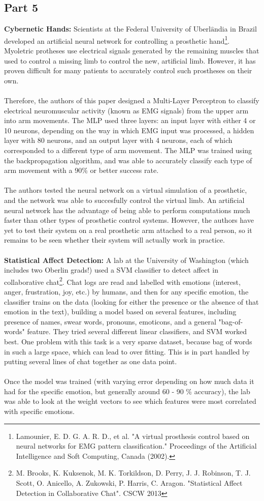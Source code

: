 \documentclass[11pt]{article}
\begin{document}
\subsection*{Part 5}

{\bf Cybernetic Hands:} Scientists at the Federal University of Uberl$\hat{\text{a}}$ndia in Brazil developed an artificial neural network for controlling a prosthetic hand\footnote{Lamounier, E. D. G. A. R. D., et al. "A virtual prosthesis control based on neural networks for EMG pattern classification." Proceedings of the Artificial Intelligence and Soft Computing, Canada (2002).}. Myoletric protheses use electrical signals generated by the remaining muscles that used to control a missing limb to control the new, artificial limb. However, it has proven difficult for many patients to accurately control such prostheses on their own. \\
\\
Therefore, the authors of this paper designed a Multi-Layer Perceptron to classify electrical neuromuscular activity (known as EMG signals) from the upper arm into arm movements. The MLP used three layers: an input layer with either 4 or 10 neurons, depending on the way in which EMG input was processed, a hidden layer with 80 neurons, and an output layer with 4 neurons, each of which corresponded to a different type of arm movement. The MLP was trained using the backpropagation algorithm, and was able to accurately classify each type of arm movement with a 90\% or better success rate. \\
\\
The authors tested the neural network on a virtual simulation of a prosthetic, and the network was able to succesfully control the virtual limb. An artificial neural network has the advantage of being able to perform computations much faster than other types of prosthetic control systems. However, the authors have yet to test their system on a real prosthetic arm attached to a real person, so it remains to be seen whether their system will actually work in practice.
\\
\\{\bf Statistical Affect Detection:} A lab at the University of Washington (which includes two Oberlin grads!) used a SVM classifier to detect affect in collaborative chat\footnote{M. Brooks, K. Kuksenok, M. K. Torkildson, D. Perry, J. J. Robinson, T. J. Scott, O. Anicello, A. Zukowski, P. Harris, C. Aragon. "Statistical Affect Detection in Collaborative Chat". CSCW 2013}. Chat logs are read and labelled with emotions (interest, anger, frustration, joy, etc.) by humans, and then for any specific emotion, the classifier trains on the data (looking for either the presence or the absence of that emotion in the text), building a model based on several features, including presence of names, swear words, pronouns, emoticons, and a general "bag-of-words" feature. They tried several different linear classifiers, and SVM worked best. One problem with this task is a very sparse dataset, because bag of words in such a large space, which can lead to over fitting. This is in part handled by putting several lines of chat together as one data point.\\
\\
Once the model was trained (with varying error depending on how much data it had for the specific emotion, but generally around 60 - 90 \% accuracy), the lab was able to look at the weight vectors to see which features were most correlated with specific emotions.
\end{document}
